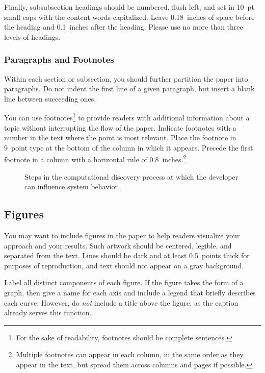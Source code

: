 \documentclass{article}
\begin{document}
Finally, subsubsection headings should be numbered, flush left, and set
in 10~pt small caps with the content words capitalized. Leave 0.18~inches 
of space before the heading and 0.1~inches after the heading. Please 
use no more than three levels of headings.

\subsubsection{Paragraphs and Footnotes}

Within each section or subsection, you should further partition the
paper into paragraphs. Do not indent the first line of a given
paragraph, but insert a blank line between succeeding ones.
 
You can use footnotes\footnote{For the sake of readability, footnotes
should be complete sentences.} to provide readers with additional
information about a topic without interrupting the flow of the paper.
Indicate footnotes with a number in the text where the point is most
relevant. Place the footnote in 9~point type at the bottom of the
column in which it appears. Precede the first footnote in a column 
with a horizontal rule of 0.8~inches.\footnote{Multiple footnotes can
appear in each column, in the same order as they appear in the text,
but spread them across columns and pages if possible.}

\begin{figure}[h]
\vskip 0.2in
\begin{center}
\setlength{\epsfxsize}{3.25in}
\centerline{}
\caption{Steps in the computational discovery process at which the
         developer can influence system behavior.}
\label{process-flow}
\end{center}
\vskip -0.2in
\end{figure} 

\subsection{Figures}
 
You may want to include figures in the paper to help readers visualize
your approach and your results. Such artwork should be centered,
legible, and separated from the text. Lines should be dark and at
least 0.5~points thick for purposes of reproduction, and text should
not appear on a gray background.


Label all distinct components of each figure. If the figure takes
the form of a graph, then give a name for each axis and include a 
legend that briefly describes each curve. However, do {\it not\/} 
include a title above the figure, as the caption already serves
this function. 
\end{document}
